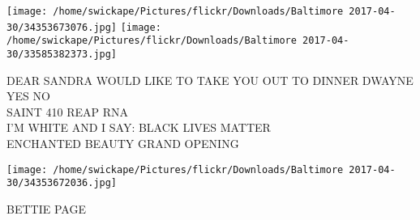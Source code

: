 \documentclass[10pt,letterpaper]{article}
\begin{document}
\texttt{[image: /home/swickape/Pictures/flickr/Downloads/Baltimore 2017-04-30/34353673076.jpg]}
\texttt{[image: /home/swickape/Pictures/flickr/Downloads/Baltimore 2017-04-30/33585382373.jpg]}

DEAR SANDRA WOULD LIKE TO TAKE YOU OUT TO DINNER DWAYNE YES NO\\
SAINT 410 REAP RNA\\
I'M WHITE AND I SAY: BLACK LIVES MATTER\\
ENCHANTED BEAUTY GRAND OPENING
\pagebreak

\texttt{[image: /home/swickape/Pictures/flickr/Downloads/Baltimore 2017-04-30/34353672036.jpg]}

BETTIE PAGE
\pagebreak
\end{document}
